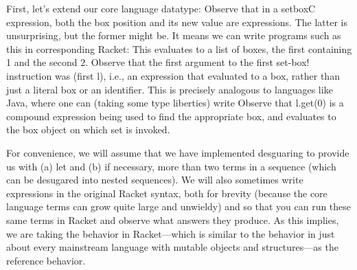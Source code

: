 
First, let’s extend our core language datatype:
Observe that in a setboxC expression, both the box position and its new value
are expressions. The latter is unsurprising, but the former might be. It means
we can write programs such as this in corresponding Racket:
This evaluates to a list of boxes, the first containing 1 and the second 2.
Observe that the first argument to the first set-box! instruction was (first l),
i.e., an expression that evaluated to a box, rather than just a literal box or
an identifier. This is precisely analogous to languages like Java, where one can
(taking some type liberties) write
Observe that l.get(0) is a compound expression being used to find the
appropriate box, and evaluates to the box object on which set is invoked.

For convenience, we will assume that we have implemented desguaring to provide
us with (a) let and (b) if necessary, more than two terms in a sequence (which
can be desugared into nested sequences). We will also sometimes write
expressions in the original Racket syntax, both for brevity (because the core
language terms can grow quite large and unwieldy) and so that you can run these
same terms in Racket and observe what answers they produce. As this implies, we
are taking the behavior in Racket—which is similar to the behavior in just about
every mainstream language with mutable objects and structures—as the reference
behavior.
